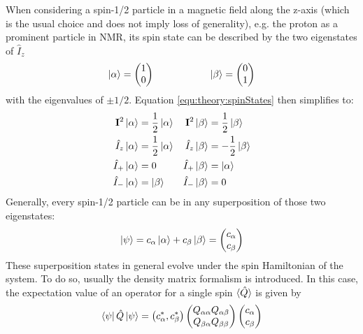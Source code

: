             When considering a spin-1/2 particle in a magnetic field along the z-axis (which is the usual choice and does not imply loss of generality), e.g. the proton as a prominent particle in NMR, its spin state can be described by the two eigenstates of $\hat{I}_z$ 
            \begin{equation}
            \ket\alpha = \begin{pmatrix}1\\0\end{pmatrix} \hspace{2 cm} \ket\beta =
            \begin{pmatrix}0\\1\end{pmatrix}
            \end{equation}
            with the eigenvalues of $\pm 1/2$.
            Equation \ref{equ:theory:spinStates} then simplifies to:
            \begin{align*}
                \mathbf{I}^2 \ket{\alpha} &= \frac{1}{2}\ket{\alpha}&\mathbf{I}^2 \ket{\beta} &= \frac{1}{2}\ket{\beta}\\
                \hat{I}_z\ket\alpha &= \frac{1}{2}\ket\alpha &\hat{I}_z\ket\beta &= -\frac{1}{2}\ket\beta\\
                \hat{I}_+\ket\alpha &= 0 &\hat{I}_+\ket\beta &= \ket\alpha\\
                \hat{I}_-\ket\alpha &= \ket\beta& \hat{I}_-\ket\beta &= 0
            \end{align*}
            Generally, every spin-1/2 particle can be in any superposition of those two eigenstates:
            \begin{equation}
                \ket\psi = c_\alpha \ket\alpha + c_\beta \ket \beta = \begin{pmatrix} c_\alpha \\
                c_\beta\end{pmatrix}
            \end{equation}
            These superposition states in general evolve under the spin Hamiltonian of the system.  To do so, usually the density matrix formalism is introduced.
             In this case, the
            expectation value of an operator for a single spin $\braket{\hat Q}$ is given by 
            \begin{equation}
            \bra\psi\hat Q\ket\psi = \left( c_\alpha^*, c_\beta^*\right)
            \begin{pmatrix}
                Q_{\alpha\alpha} Q_{\alpha\beta}\\
                Q_{\beta\alpha} Q_{\beta\beta}
            \end{pmatrix}
            \begin{pmatrix}
                c_\alpha\\
                c_\beta
            \end{pmatrix}
            \end{equation}

